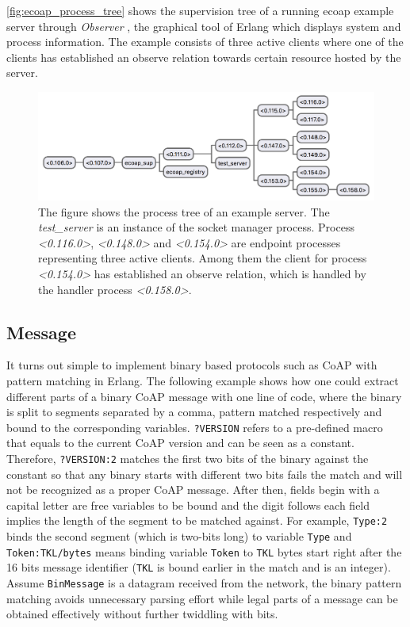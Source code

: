\autoref{fig:ecoap_process_tree} shows the supervision tree of a running ecoap example server through \textit{Observer} \autocite{erlang_observer}, the graphical tool of Erlang which displays system and process information. The example consists of three active clients where one of the clients has established an observe relation towards certain resource hosted by the server. 

\begin{figure}[!htbp]
\centering
\includegraphics[scale = 0.6]{ecoap_process_tree}
\caption[Process tree of an example server]{The figure shows the process tree of an example server. The 
\textit{test\_server} is an instance of the socket manager process. Process \textit{<0.116.0>},  \textit{<0.148.0>} and \textit{<0.154.0>} are endpoint processes representing three active clients. Among them the client for process \textit{<0.154.0>} has established an observe relation, which is handled by the handler process \textit{<0.158.0>}.}
\label{fig:ecoap_process_tree}
\end{figure}

\subsection{Message}

It turns out simple to implement binary based protocols such as CoAP with pattern matching in Erlang. The following example shows how one could extract different parts of a binary CoAP message with one line of code, where the binary is split to segments separated by a comma, pattern matched respectively and bound to the corresponding variables. \verb|?VERSION| refers to a pre-defined macro that equals to the current CoAP version and can be seen as a constant. Therefore, \verb|?VERSION:2| matches the first two bits of the binary against the constant so that any binary starts with different two bits fails the match and will not be recognized as a proper CoAP message. After then, fields begin with a capital letter are free variables to be bound and the digit follows each field implies the length of the segment to be matched against. For example, \verb|Type:2| binds the second segment (which is two-bits long) to variable \verb|Type| and \verb|Token:TKL/bytes| means binding variable \verb|Token| to \verb|TKL| bytes start right after the 16 bits message identifier (\verb|TKL| is bound earlier in the match and is an integer).  Assume \verb|BinMessage| is a datagram received from the network, the binary pattern matching avoids unnecessary parsing effort while legal parts of a message can be obtained effectively without further twiddling with bits. 

